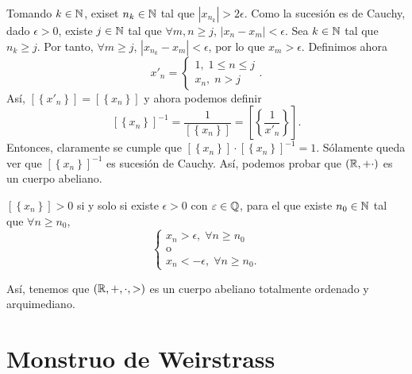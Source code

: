 Tomando $\displaystyle k \in \mathbb{N} $, exiset $\displaystyle n_{k} \in \mathbb{N} $ tal que $\displaystyle \left|x_{n_{k}}\right| > 2\epsilon  $. Como la sucesión es de Cauchy, dado $\displaystyle \epsilon > 0 $, existe $\displaystyle j \in \mathbb{N} $ tal que $\displaystyle \forall m,n \geq j $, $\displaystyle \left|x_{n}-x_{m}\right| < \epsilon  $. Sea $\displaystyle k \in \mathbb{N} $ tal que $\displaystyle n_{k} \geq j $. Por tanto, $\displaystyle \forall m \geq j $, $\displaystyle \left|x_{n_{k}}-x_{m}\right| < \epsilon  $, por lo que $\displaystyle x_{m} > \epsilon  $. Definimos ahora
\[x'_{n} = 
\begin{cases}
1, \; 1 \leq n \leq j \\
x_{n}, \; n > j
\end{cases}
.\]
Así, $\displaystyle [ \left\{ x'_{n}\right\}] = [ \left\{ x_{n}\right\}]  $ y ahora podemos definir
\[[ \left\{ x_{n}\right\}] ^{-1} = \frac{1}{[ \left\{ x_{n}\right\}] } = \left[ \left\{ \frac{1}{x'_{n}}\right\}\right]  .\]
Entonces, claramente se cumple que $\displaystyle [ \left\{ x_{n}\right\}] \cdot [ \left\{ x_{n}\right\}] ^{-1} = 1 $. Sólamente queda ver que $\displaystyle [ \left\{ x_{n}\right\}] ^{-1} $ es sucesión de Cauchy.
Así, podemos probar que $\displaystyle \left(\mathbb{R}, + \cdot\right) $ es un cuerpo abeliano.

\begin{fdefinition}[]
\normalfont $\displaystyle [ \left\{ x_{n}\right\}] > 0 $ si y solo si existe $\displaystyle \epsilon > 0 $ con $\displaystyle \varepsilon \in \mathbb{Q} $, para el que existe $\displaystyle n_{0} \in \mathbb{N} $ tal que $\displaystyle \forall n \geq n_{0} $, 
\[
\begin{cases}
x_{n} > \epsilon, \; \forall n\geq n_{0} \\
\text{o} \\
x_{n} < -\epsilon, \; \forall n\geq n_{0}.
\end{cases}
\]
\end{fdefinition}

Así, tenemos que $\displaystyle \left(\mathbb{R}, + , \cdot, >\right) $ es un cuerpo abeliano totalmente ordenado y arquimediano. 
\chapter{Monstruo de Weirstrass}
